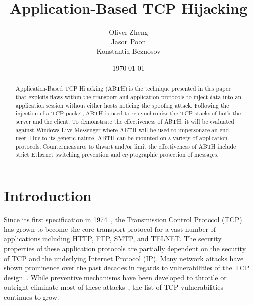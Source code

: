 \documentclass{sig-alternate}
\begin{document}

\title{
Application-Based TCP Hijacking
}

\author {
	\alignauthor
	Oliver Zheng\\
	\alignauthor
	Jason Poon\\
	\alignauthor
	Konstantin Beznosov\\
}

\date{\today}

\maketitle

\begin{abstract}
Application-Based TCP Hijacking (ABTH) is the technique presented in this paper that exploits flaws within the transport and application protocols to inject data into an application session without either hosts noticing the spoofing attack. Following the injection of a TCP packet, ABTH is used to re-synchronize the TCP stacks of both the server and the client. To demonstrate the effectiveness of ABTH, it will be evaluated against Windows Live Messenger where ABTH will be used to impersonate an end-user. Due to its generic nature, ABTH can be mounted on a variety of application protocols. Countermeasures to thwart and/or limit the effectiveness of ABTH include strict Ethernet switching prevention and cryptographic protection of messages.
\end{abstract}



\section{Introduction}

Since its first specification in 1974~\cite{rfc:tcp}, the Transmission Control Protocol (TCP) has grown to become the core transport protocol for a vast number of applications including HTTP, FTP, SMTP, and TELNET. The security properties of these application protocols are partially dependent on the security of TCP and the underlying Internet Protocol (IP). Many network attacks have shown prominence over the past decades in regards to vulnerabilities of the TCP design~\cite{harris:tcpattacks}. While preventive mechanisms have been developed to throttle or outright eliminate most of these attacks~\cite{dubrawsky:layer2}, the list of TCP vulnerabilities continues to grow. 
\end{document}
